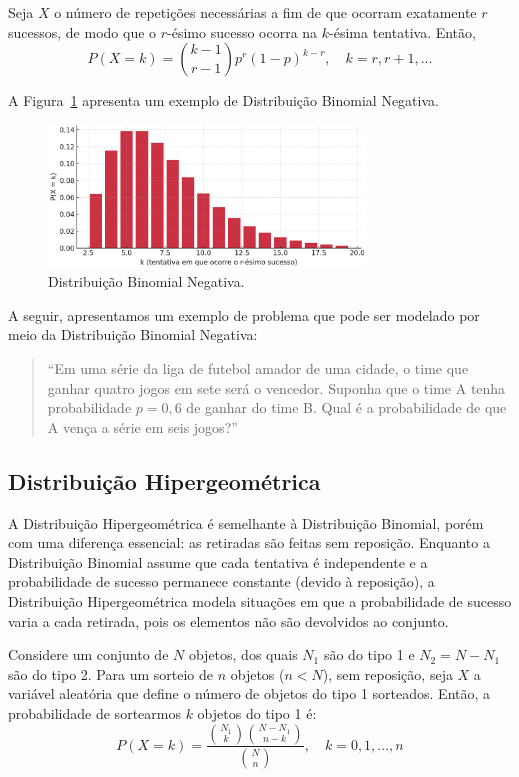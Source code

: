 \documentclass{article}
\begin{document}
Seja $X$ o número de repetições necessárias a fim de que ocorram exatamente $r$ sucessos, de modo que o $r$-ésimo sucesso ocorra na $k$-ésima tentativa. Então,
    $$
    P(X = k) = \binom{k - 1}{r - 1} p^r (1 - p)^{k - r}, \quad k = r, r + 1, \ldots
    $$

A Figura~\ref{fig:dist_disc_binomial_negativa} apresenta um exemplo de Distribuição Binomial Negativa.

\begin{figure}[H]
    \centering
    \includegraphics[width=0.75\textwidth]{figuras/dist_disc_binomial_negativa.png}
    \caption{Distribuição Binomial Negativa.}
    \label{fig:dist_disc_binomial_negativa}
\end{figure}

A seguir, apresentamos um exemplo de problema que pode ser modelado por meio da Distribuição Binomial Negativa:
\begin{quote}
``Em uma série da liga de futebol amador de uma cidade, o time que ganhar quatro jogos em sete será o vencedor. Suponha que o time
A tenha probabilidade $p = 0,6$ de ganhar do time B. Qual é a probabilidade de que A vença a série em seis jogos?''
\end{quote}

\subsection{Distribuição Hipergeométrica}
A Distribuição Hipergeométrica é semelhante à Distribuição Binomial, porém com uma diferença essencial: as retiradas são feitas sem reposição. Enquanto a Distribuição Binomial assume que cada tentativa é independente e a probabilidade de sucesso permanece constante (devido à reposição), a Distribuição Hipergeométrica modela situações em que a probabilidade de sucesso varia a cada retirada, pois os elementos não são devolvidos ao conjunto.

Considere um conjunto de $N$ objetos, dos quais $N_1$ são do tipo 1 e $N_2 = N - N_1$ são do tipo 2.  
Para um sorteio de $n$ objetos ($n < N$), sem reposição, seja $X$ a variável aleatória que define o número de objetos do tipo 1 sorteados.  
Então, a probabilidade de sortearmos $k$ objetos do tipo 1 é:
    $$
    P(X = k) = \frac{\binom{N_1}{k} \binom{N - N_1}{n - k}}{\binom{N}{n}}, \quad k = 0, 1, \ldots, n
    $$
\end{document}
